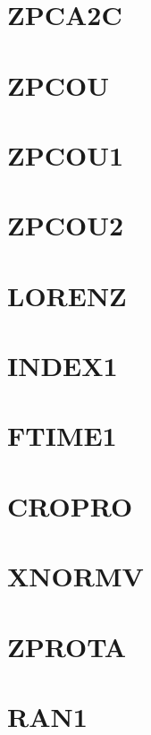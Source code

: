 \documentclass[14pt,UTF8]{ctexbook}
\begin{document}
\section{ZPCA2C}
\section{ZPCOU}
\section{ZPCOU1}
\section{ZPCOU2}
\section{LORENZ}
\section{INDEX1}
\section{FTIME1}
\section{CROPRO}
\section{XNORMV}
\section{ZPROTA}
\section{RAN1}
\end{document}
